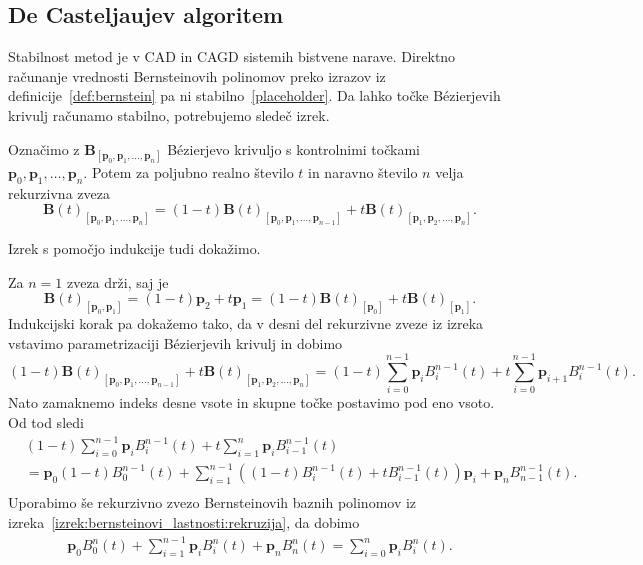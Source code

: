 \documentclass[isrm2, tisk]{fmfdelo}
\newcommand{\p}{\mathbf{p}}
\newcommand{\lilb}[2]{B_{#1}^{#2}(t)}
\newcommand{\bigbbt}{\textbf{B}(t)}
\newcommand{\bernsteinsump}[2]{\sum_{#1=0}^{#2} \p_{#1}\lilb{#1}{#2}}
\begin{document}
    \subsection{De Casteljaujev algoritem}
    Stabilnost metod je v CAD in CAGD sistemih bistvene narave.
    Direktno računanje vrednosti Bernsteinovih polinomov preko izrazov iz definicije~\ref{def:bernstein} pa ni stabilno~\ref{placeholder}.
    Da lahko točke Bézierjevih krivulj računamo stabilno, potrebujemo sledeč izrek.
    \begin{izrek}
        \label{izrek:decastelaju-rekurzija}
        Označimo z $\mathbf{B}_{[\p_0,\p_1,\dots,\p_n]}$ Bézierjevo krivuljo s kontrolnimi točkami \\
        $\p_0,\p_1,\dots,\p_n$.
        Potem za poljubno realno število $t$ in naravno število $n$ velja rekurzivna zveza \[\bigbbt_{[\p_0,\p_1,\dots,\p_n]} = (1-t)\bigbbt_{[\p_0,\p_1,\dots,\p_{n-1}]} +t\bigbbt_{[\p_1,\p_2,\dots,\p_n]}.\]
    \end{izrek}
    \noindent Izrek s pomočjo indukcije tudi dokažimo.
    \begin{dokaz}
        Za $n=1$ zveza drži, saj je  \[\bigbbt_{[\p_0,\p_1]} = (1-t)\p_2 +t\p_1 = (1-t)\bigbbt_{[\p_0]} +t\bigbbt_{[\p_1]}.\]
        Indukcijski korak pa dokažemo tako, da v desni del rekurzivne zveze iz izreka vstavimo parametrizaciji Bézierjevih krivulj in dobimo
        \[ (1-t) \bigbbt_{[\p_0,\p_1,\dots,\p_{n-1}]}+t\bigbbt_{[\p_1,\p_2,\dots,\p_n]} = (1-t)\bernsteinsump{i}{n-1}+t\sum_{i=0}^{n-1} \p_{i+1}B_i^{n-1}(t).\]
        Nato zamaknemo indeks desne vsote in skupne točke postavimo pod eno vsoto.
        Od tod sledi
        \begin{align*}
            &(1-t)\bernsteinsump{i}{n-1}+ t\sum_{i=1}^{n} \p_{i}B_{i-1}^{n-1}(t) \\
            &= \p_0(1-t)B_{0}^{n-1}(t) + \sum_{i=1}^{n-1}\left((1-t)B_i^{n-1}(t) + tB_{i-1}^{n-1}(t)\right)\p_{i} + \p_n B_{n-1}^{n-1}(t). \\
        \end{align*}
        Uporabimo še rekurzivno zvezo Bernsteinovih baznih polinomov iz izreka~\ref{izrek:bernsteinovi_lastnosti:rekruzija}, da dobimo
        \begin{align*}
            \p_0B_{0}^{n}(t) + \sum_{i=1}^{n-1}\p_{i}B_i^n(t) + \p_n B_{n}^{n}(t) = \sum_{i=0}^{n}\p_{i}B_i^n(t).
        \end{align*}
    \end{dokaz}
\end{document}
